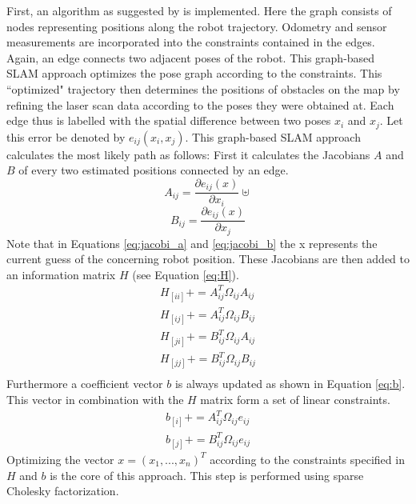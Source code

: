 \documentclass{ba-kecs}
\begin{document}
First, an algorithm as suggested by \citep{Grisetti} is implemented. Here the graph consists of nodes representing positions along the robot trajectory. Odometry and sensor measurements are incorporated into the constraints contained in the edges. Again, an edge connects two adjacent poses of the robot. This graph-based SLAM approach optimizes the pose graph according to the constraints. This ``optimized" trajectory then determines the positions of obstacles on the map by refining the laser scan data according to the poses they were obtained at. Each edge thus is labelled with the spatial difference between two poses \(x_i\) and \(x_j\). Let this error be denoted by \(e_{ij}(x_i, x_j)\). This graph-based SLAM approach calculates the most likely path as follows:
First it calculates the Jacobians \(A\) and \(B\) of every two estimated positions connected by an edge.
\begin{equation}
\label{eq:jacobi_a}
	A_{ij} = \frac{\partial e_{ij}(x)}{\partial x_i}\uplus
\end{equation}
\begin{equation}
\label{eq:jacobi_b}
	B_{ij} = \frac{\partial e_{ij}(x)}{\partial x_j}
\end{equation}
Note that in Equations \ref{eq:jacobi_a} and \ref{eq:jacobi_b} the x represents the current guess of the concerning robot position. These Jacobians are then added to an information matrix \(H\) (see Equation \ref{eq:H}).
\begin{equation}
\label{eq:H}
\begin{aligned}
	H_{[ii]} += A^{T}_{ij} \Omega_{ij} A_{ij} \\
	H_{[ij]} += A^{T}_{ij} \Omega_{ij} B_{ij} \\
	H_{[ji]} += B^{T}_{ij} \Omega_{ij} A_{ij} \\
	H_{[jj]} += B^{T}_{ij} \Omega_{ij} B_{ij} \\
\end{aligned}
\end{equation}
Furthermore a coefficient vector \(b\) is always updated as shown in Equation \ref{eq:b}. This vector in combination with the \(H\) matrix form a set of linear constraints.
\begin{equation}
\label{eq:b}
\begin{aligned}
	b_{[i]} += A^{T}_{ij} \Omega_{ij} e_{ij} \\
	b_{[j]} += B^{T}_{ij} \Omega_{ij} e_{ij} 
\end{aligned}
\end{equation}
Optimizing the vector \(x = (x_1, ..., x_n)^T \) according to the constraints specified in \(H\) and \(b\) is the core of this approach. This step is performed using sparse Cholesky factorization. 
\end{document}
